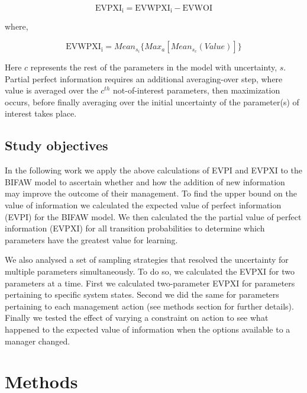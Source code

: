 \documentclass[draft]{article}
\theoremstyle{definition}
\theoremstyle{definition}
\theoremstyle{definition}
\theoremstyle{remark}
\begin{document}
\begin{equation}
\mathrm{EVPXI_i} = \mathrm{EVWPXI_i} - \mathrm{EVWOI}
\label{eq:EVPXIch1}
\end{equation}

where,

\begin{equation}
\mathrm{EVWPXI_i} = Mean_{s_i}\{Max_{a}[Mean_{s_c}(Value)]\}
\label{eq:EVWPXIch1}
\end{equation}

Here \(c\) represents the rest of the parameters in the model with
uncertainty, \(s\). Partial perfect information requires an additional
averaging-over step, where value is averaged over the \(c^{th}\)
not-of-interest parameters, then maximization occurs, before finally
averaging over the initial uncertainty of the parameter(s) of interest
takes place.

\subsection*{Study objectives}\label{study-objectives}

In the following work we apply the above calculations of EVPI and EVPXI
to the BIFAW model to ascertain whether and how the addition of new
information may improve the outcome of their management. To find the
upper bound on the value of information we calculated the expected value
of perfect information (EVPI) for the BIFAW model. We then calculated
the the partial value of perfect information (EVPXI) for all transition
probabilities to determine which parameters have the greatest value for
learning.

We also analysed a set of sampling strategies that resolved the
uncertainty for multiple parameters simultaneously. To do so, we
calculated the EVPXI for two parameters at a time. First we calculated
two-parameter EVPXI for parameters pertaining to specific system states.
Second we did the same for parameters pertaining to each management
action (see methods section for further details). Finally we tested the
effect of varying a constraint on action to see what happened to the
expected value of information when the options available to a manager
changed.

\section*{Methods}\label{methods}
\end{document}
